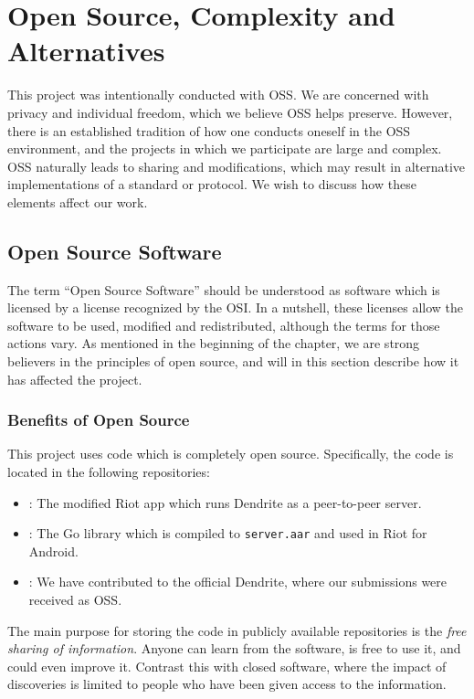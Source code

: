 \chapter{Open Source, Complexity and Alternatives}\label{chp:open_source_complexity_alternatives}
This project was intentionally conducted with \ac{OSS}.
We are concerned with privacy and individual freedom, which we believe \ac{OSS} helps preserve.
However, there is an established tradition of how one conducts oneself in the \ac{OSS} environment, and the projects in which we participate are large and complex.
\ac{OSS} naturally leads to sharing and modifications, which may result in alternative implementations of a standard or protocol.
We wish to discuss how these elements affect our work.

\section{Open Source Software}\label{sec:open_source}
The term ``Open Source Software'' should be understood as software which is licensed by a license recognized by the \ac{OSI}\cite{open_source_initiative}.
In a nutshell, these licenses allow the software to be used, modified and redistributed, although the terms for those actions vary.
As mentioned in the beginning of the chapter, we are strong believers in the principles of open source, and will in this section describe how it has affected the project.

\subsection{Benefits of Open Source}\label{subsec:benefits_of_open_source}
This project uses code which is completely open source.
Specifically, the code is located in the following repositories:
\begin{itemize}
	\item{
		:
		The modified Riot app which runs Dendrite as a peer-to-peer server.
	}
	\item{
		:
		The Go library which is compiled to \texttt{server.aar} and used in Riot for Android.
	}
	\item{
		:
		We have contributed to the official Dendrite, where our submissions were received as \ac{OSS}.
	}
\end{itemize}

The main purpose for storing the code in publicly available repositories is the \textit{free sharing of information}.
Anyone can learn from the software, is free to use it, and could even improve it.
Contrast this with closed software, where the impact of discoveries is limited to people who have been given access to the information.

